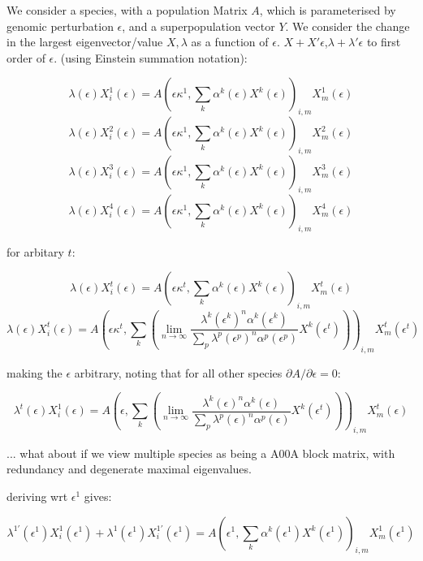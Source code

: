 \documentclass{article}
\begin{document}

We consider a species, with a population Matrix $A$, which is parameterised by genomic perturbation $\epsilon$, and a superpopulation vector $Y$. We consider the change in the largest eigenvector/value $X,\lambda$ as a function of $\epsilon$.
$X+X'\epsilon$,$\lambda+\lambda'\epsilon$ to first order of $\epsilon$. (using Einstein summation notation):

$$ \lambda(\epsilon)X_{i}^1(\epsilon) = A(\epsilon\kappa^1,\sum_k\alpha^k(\epsilon)X^k(\epsilon))_{i,m}X_{m}^1(\epsilon) $$
$$ \lambda(\epsilon)X_{i}^2(\epsilon) = A(\epsilon\kappa^1,\sum_k\alpha^k(\epsilon)X^k(\epsilon))_{i,m}X_{m}^2(\epsilon) $$
$$ \lambda(\epsilon)X_{i}^3(\epsilon) = A(\epsilon\kappa^1,\sum_k\alpha^k(\epsilon)X^k(\epsilon))_{i,m}X_{m}^3(\epsilon) $$
$$ \lambda(\epsilon)X_{i}^4(\epsilon) = A(\epsilon\kappa^1,\sum_k\alpha^k(\epsilon)X^k(\epsilon))_{i,m}X_{m}^4(\epsilon) $$

for arbitary $t$:

$$ \lambda(\epsilon)X_{i}^t(\epsilon) = A(\epsilon\kappa^t,\sum_k\alpha^k(\epsilon)X^k(\epsilon))_{i,m}X_{m}^t(\epsilon) $$
$$ \lambda(\epsilon)X_{i}^t(\epsilon) = A(\epsilon\kappa^t,\sum_k\left( \lim_{n\rightarrow\infty} \frac{\lambda^k(\epsilon^k)^n\alpha^k(\epsilon^k)}{\sum_p\lambda^p(\epsilon^p)^n\alpha^p(\epsilon^p)}X^k(\epsilon^t) \right))_{i,m}X_{m}^t(\epsilon^t) $$

making the $\epsilon$ arbitrary, noting that for all other species $\partial A / \partial \epsilon =0$:

$$ \lambda^t(\epsilon)X_{i}^1(\epsilon) = A(\epsilon,\sum_k\left( \lim_{n\rightarrow\infty} \frac{\lambda^k(\epsilon)^n\alpha^k(\epsilon)}{\sum_p\lambda^p(\epsilon)^n\alpha^p(\epsilon)}X^k(\epsilon^t) \right))_{i,m}X_{m}^t(\epsilon) $$

... what about if we view multiple species as being a A00A block matrix, with redundancy and degenerate maximal eigenvalues.



deriving wrt $\epsilon^1$ gives:

$$ \lambda^{1\prime}(\epsilon^1)X_{i}^1(\epsilon^1) + \lambda^1(\epsilon^1)X_{i}^{1\prime}(\epsilon^1) = A(\epsilon^1,\sum_k\alpha^k(\epsilon^1)X^k(\epsilon^1))_{i,m}X_{m}^1(\epsilon^1) $$
\end{document}
